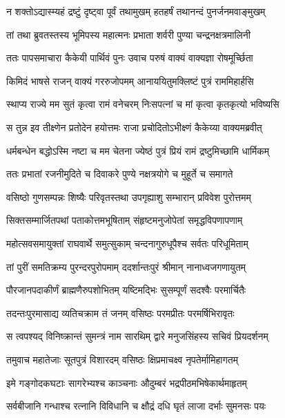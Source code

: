 \twolineshloka
{न शक्तोऽद्यास्म्यहं द्रष्टुं दृष्ट्वा पूर्वं तथामुखम्}
{हतहर्षं तथानन्दं पुनर्जनमवाङ्मुखम्} %

\twolineshloka
{तां तथा ब्रुवतस्तस्य भूमिपस्य महात्मनः}
{प्रभाता शर्वरी पुण्या चन्द्रनक्षत्रमालिनी} %

\twolineshloka
{ततः पापसमाचारा कैकेयी पार्थिवं पुनः}
{उवाच परुषं वाक्यं वाक्यज्ञा रोषमूर्च्छिता} %

\twolineshloka
{किमिदं भाषसे राजन् वाक्यं गररुजोपमम्}
{आनाययितुमक्लिष्टं पुत्रं राममिहार्हसि} %

\twolineshloka
{स्थाप्य राज्ये मम सुतं कृत्वा रामं वनेचरम्}
{निःसपत्नां च मां कृत्वा कृतकृत्यो भविष्यसि} %

\twolineshloka
{स तुन्न इव तीक्ष्णेन प्रतोदेन हयोत्तमः}
{राजा प्रचोदितोऽभीक्ष्णं कैकेय्या वाक्यमब्रवीत्} %

\twolineshloka
{धर्मबन्धेन बद्धोऽस्मि नष्टा च मम चेतना}
{ज्येष्ठं पुत्रं प्रियं रामं द्रष्टुमिच्छामि धार्मिकम्} %

\twolineshloka
{ततः प्रभातां रजनीमुदिते च दिवाकरे}
{पुण्ये नक्षत्रयोगे च मुहूर्ते च समागते} %

\twolineshloka
{वसिष्ठो गुणसम्पन्नः शिष्यैः परिवृतस्तथा}
{उपगृह्याशु सम्भारान् प्रविवेश पुरोत्तमम्} %

\twolineshloka
{सिक्तसम्मार्जितपथां पताकोत्तमभूषिताम्}
{संहृष्टमनुजोपेतां समृद्धविपणापणाम्} %

\twolineshloka
{महोत्सवसमायुक्तां राघवार्थे समुत्सुकाम्}
{चन्दनागुरुधूपैश्च सर्वतः परिधूमिताम्} %

\twolineshloka
{तां पुरीं समतिक्रम्य पुरन्दरपुरोपमाम्}
{ददर्शान्तःपुरं श्रीमान् नानाध्वजगणायुतम्} %

\twolineshloka
{पौरजानपदाकीर्णं ब्राह्मणैरुपशोभितम्}
{यष्टिमद्भिः सुसम्पूर्णं सदश्वैः परमार्चितैः} %

\twolineshloka
{तदन्तःपुरमासाद्य व्यतिचक्राम तं जनम्}
{वसिष्ठः परमप्रीतः परमर्षिभिरावृतः} %

\twolineshloka
{स त्वपश्यद् विनिष्क्रान्तं सुमन्त्रं नाम सारथिम्}
{द्वारे मनुजसिंहस्य सचिवं प्रियदर्शनम्} %

\twolineshloka
{तमुवाच महातेजाः सूतपुत्रं विशारदम्}
{वसिष्ठः क्षिप्रमाचक्ष्व नृपतेर्मामिहागतम्} %

\twolineshloka
{इमे गङ्गोदकघटाः सागरेभ्यश्च काञ्चनाः}
{औदुम्बरं भद्रपीठमभिषेकार्थमाहृतम्} %

\twolineshloka
{सर्वबीजानि गन्धाश्च रत्नानि विविधानि च}
{क्षौद्रं दधि घृतं लाजा दर्भाः सुमनसः पयः} %

